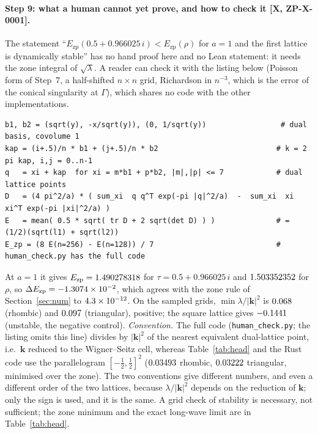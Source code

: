 \documentclass[10pt]{article}
\newcommand{\tier}[1]{\textsf{[#1]}}
\newcommand{\Ezp}{E_{\mathrm{zp}}}
\begin{document}
\paragraph{Step 9: what a human cannot yet prove, and how to check it \tier{X, ZP-X-0001}.} The statement ``$\Ezp(0.5+0.966025\,i)<\Ezp(\rho)$ for $a=1$ and the first lattice is dynamically stable'' has no hand proof here and
no Lean statement: it needs the zone integral of $\sqrt{\lambda}$. A reader can check it with the listing below (Poisson form of Step~7, a half-shifted $n\times n$ grid, Richardson in $n^{-3}$, which is the error of the conical
singularity at $\Gamma$), which shares no code with the other implementations.
\begin{lstlisting}[basicstyle=\ttfamily\scriptsize]
b1, b2 = (sqrt(y), -x/sqrt(y)), (0, 1/sqrt(y))                 # dual basis, covolume 1
kap = (i+.5)/n * b1 + (j+.5)/n * b2                           # k = 2 pi kap, i,j = 0..n-1
q   = xi + kap  for xi = m*b1 + p*b2, |m|,|p| <= 7            # dual lattice points
D   = (4 pi^2/a) * ( sum_xi  q q^T exp(-pi |q|^2/a)  -  sum_xi  xi xi^T exp(-pi |xi|^2/a) )
E   = mean( 0.5 * sqrt( tr D + 2 sqrt(det D) ) )              # = (1/2)(sqrt(l1) + sqrt(l2))
E_zp = (8 E(n=256) - E(n=128)) / 7                            # human_check.py has the full code
\end{lstlisting}
At $a=1$ it gives $\Ezp=\ZPHumanHead$ for $\tau=0.5+0.966025\,i$ and $1.503352352$ for $\rho$, so $\Delta\Ezp=\ZPHumandE$, which agrees with the zone rule of
Section~\ref{sec:num} to $4.3\times10^{-12}$. On the sampled grids, $\min\lambda/|\mathbf k|^2$ is $0.068$ (rhombic) and $0.097$ (triangular), positive; the square lattice gives
$-0.1441$ (unstable, the negative control). \emph{Convention.} The full code (\texttt{human\_check.py}; the listing omits this line) divides by $|\mathbf k|^2$ of the nearest equivalent dual-lattice point, i.e.\ $\mathbf k$ reduced to the Wigner--Seitz cell, whereas Table~\ref{tab:head} and the Rust code use the parallelogram $[-\tfrac12,\tfrac12]^2$
($0.03493$ rhombic, $0.03222$ triangular, minimised over the zone). The two conventions give different numbers, and even a different order of the two lattices, because $\lambda/|\mathbf k|^2$ depends on the
reduction of $\mathbf k$; only the sign is used, and it is the same. A grid check of stability is necessary, not sufficient; the zone minimum and the exact long-wave limit are in Table~\ref{tab:head}.

\end{document}
